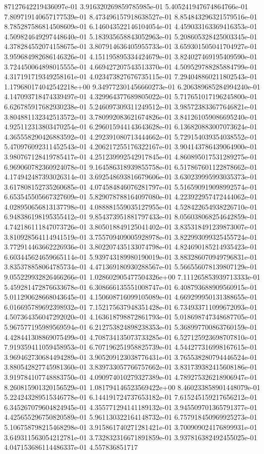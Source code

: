 87127642219436097e-01	3.916320269859785985e-01	5.405241947674864766e-01	7.809719140657177539e-01	8.473496157918638527e-01	8.854843296321579516e-01	8.785287586814508609e-01	6.146043522146104054e-01	4.459033163369416353e-01	4.509824649297448640e-01	5.183935658843052963e-01	5.208605328425003345e-01	4.378284552074158675e-01	3.807914636405955733e-01	3.659301505041704927e-01	3.959684982686146326e-01	4.151195895334424679e-01	3.824027469195409590e-01	3.724450064898015555e-01	4.669427207543513370e-01	4.509529788285884799e-01	4.317191719349258161e-01	4.023473827676735115e-01	7.294048860211802543e-01	1.179680174042542218e+00	9.349772301456660273e-01	6.206389685284994240e-01	4.147093718474339497e-01	4.329964377689805022e-01	5.717651017196245800e-01	6.626785917682930238e-01	5.246097309311249512e-01	3.985723833677646821e-01	3.804881132342513572e-01	3.780992083621674826e-01	3.841261059086695240e-01	4.925112313803470254e-01	6.296015944143643628e-01	6.136820883007073624e-01	4.365558290426883592e-01	4.292391080713444662e-01	5.729154039354038552e-01	5.470976092311452543e-01	4.206217255176322167e-01	3.904143786439064900e-01	3.980767128419785417e-01	4.251239992542917845e-01	4.860895017531289275e-01	6.969060782360924078e-01	9.164586318939855758e-01	6.517867601122878662e-01	4.174942487393026314e-01	3.692548693816679606e-01	3.630239995993035373e-01	3.617808152735260685e-01	4.074584846076281797e-01	5.516590919098992574e-01	6.653545505667327609e-01	5.829078788164097080e-01	4.223922957472444062e-01	4.028950656813137798e-01	4.088881559035127955e-01	4.528422654938226710e-01	6.948386198195355412e-01	9.854373951881797433e-01	8.056038068254642859e-01	4.742186111847073726e-01	3.805018849125041402e-01	3.835318491239873007e-01	3.810928564114941519e-01	3.755709409005928978e-01	3.822993099325455724e-01	3.772914463662226936e-01	3.802207435133074798e-01	4.824690185214935423e-01	6.603445624659665114e-01	5.939743189980190019e-01	3.883286070949796831e-01	3.835378858064785734e-01	4.471369180930288567e-01	5.566556078139807129e-01	9.055229932826466266e-01	1.028602905477504326e+00	7.111265853939713333e-01	5.459281472876633678e-01	6.308666135551008747e-01	6.408793688909560915e-01	5.011290628668043645e-01	4.150608716099105089e-01	4.669299950131388655e-01	6.016695789692398932e-01	7.152175637948351428e-01	6.734933711099672093e-01	4.507364356047292020e-01	4.163618798872861793e-01	5.018698747348687705e-01	5.967577195989569594e-01	6.212753824898238353e-01	5.368997700863760159e-01	4.428441308869075499e-01	4.708734135073733285e-01	6.527125923698707810e-01	7.919359411059458953e-01	6.707196251958825739e-01	4.544277316998167615e-01	3.969462730684494289e-01	3.905209123038776431e-01	3.765538280794446524e-01	3.880542827745981360e-01	3.839733057766757662e-01	3.831739382415608186e-01	3.919784107748883750e-01	4.090974010279327389e-01	4.789275326218906947e-01	8.260815901320156529e-01	1.081794146523569422e+00	8.460233858901448079e-01	5.224243289515346778e-01	6.144191724737653182e-01	7.615245159217656212e-01	6.345267079604824945e-01	4.355771294141189132e-01	3.945509701365791377e-01	4.425655296750820589e-01	5.961130322164148732e-01	6.757918450969925273e-01	5.106758798215468298e-01	3.915861740271281421e-01	3.700909024176899931e-01	3.649311563054212781e-01	3.732832316671891859e-01	3.937816382492455025e-01	4.047153686114486337e-01	4.557836851717